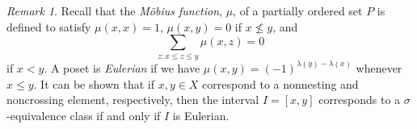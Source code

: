 \documentclass[11pt]{amsart}
\theoremstyle{plain}
\theoremstyle{definition}
\theoremstyle{remark}
\newtheorem{rmk}[theorem]{Remark}
\numberwithin{equation}{subsection}
\newcommand{\be}{\beta}
\newcommand{\coplanar}{coplanar\xspace}
\begin{document}



\begin{rmk}\label{rmk:shell6}
Recall that the {\it M\"obius function}, $\mu$, of a partially ordered set $P$
is defined to satisfy $\mu(x, x)=1$, $\mu(x, y)=0$ if $x \not\leq y$, and $$
\sum_{z : x \leq z \leq y} \mu(x, z) = 0 $$ if $x < y$. A poset is {\it
Eulerian} if we have $\mu(x, y) = (-1)^{\lambda(y) - \lambda(x)}$ whenever $x
\leq y$.  It can be shown that if $x, y \in X$ correspond to a nonnesting and
noncrossing element, respectively, then the interval $I = [x, y]$ corresponds to
a $\sigma$-equivalence class if and only if $I$ is Eulerian.
\end{rmk}
\end{document}
